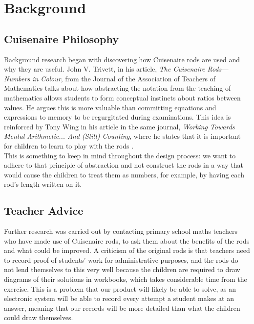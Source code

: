 \chapter{Background}


\section{Cuisenaire\textsuperscript{\textregistered} Philosophy}
Background research began with discovering how Cuisenaire\textsuperscript{\textregistered} rods are used and why they are useful. John V. Trivett, in his article, \emph{The Cuisenaire Rods—Numbers in Colour}, from the Journal of the Association of Teachers of Mathematics \cite{johnv.trivett1962} talks about how abstracting the notation from the teaching of mathematics allows students to form conceptual instincts about ratios between values. He argues this is more valuable than committing equations and expressions to memory to be regurgitated during examinations. This idea is reinforced by Tony Wing in his article in the same journal, \emph{Working Towards Mental Arithmetic... And (Still) Counting}\cite{tonywing1996}, where he states that it is important for children to learn to play with the rods .\\

This is something to keep in mind throughout the design process: we want to adhere to that principle of abstraction and not construct the rods in a way that would cause the children to treat them as numbers, for example, by having each rod's length written on it. \\

\section{Teacher Advice}

Further research was carried out by contacting primary school maths teachers who have made use of Cuisenaire\textsuperscript{\textregistered} rods, to ask them about the benefits of the rods and what could be improved. A criticism of the original rods is that teachers need to record proof of students' work for administrative purposes, and the rods do not lend themselves to this very well because the children are required to draw diagrams of their solutions in workbooks, which takes considerable time from the exercise. This is a problem that our product will likely be able to solve, as an electronic system will be able to record every attempt a student makes at an answer, meaning that our records will be more detailed than what the children could draw themselves.\\

